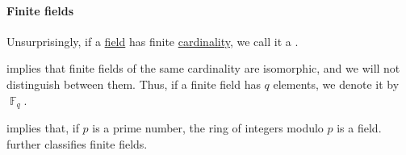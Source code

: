 \paragraph{Finite fields}

\begin{definition}\label{def:finite_field}\mimprovised
  Unsurprisingly, if a \hyperref[def:field]{field} has finite \hyperref[thm:cardinality_existence]{cardinality}, we call it a .

   implies that finite fields of the same cardinality are isomorphic, and we will not distinguish between them. Thus, if a finite field has \( q \) elements, we denote it by \( \BbbF_q \).
\end{definition}
\begin{comments}
  \item {} implies that, if \( p \) is a prime number, the ring of integers modulo \( p \) is a field.  further classifies finite fields.
\end{comments}

